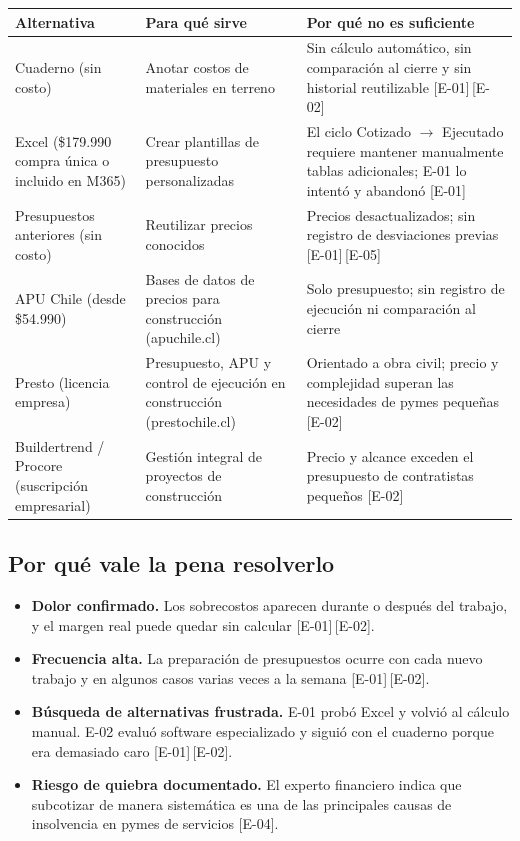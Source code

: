 \documentclass[11pt]{article}
\newcommand{\ev}[1]{\textcolor{prblue}{[#1]}}
\begin{document}
\begin{tabularx}{\linewidth}{@{}lXX@{}}
\toprule
\textbf{Alternativa} & \textbf{Para qué sirve} & \textbf{Por qué no es suficiente} \\
\midrule
Cuaderno (sin costo) & Anotar costos de materiales en terreno & Sin cálculo automático, sin comparación al cierre y sin historial reutilizable \ev{E-01}\,\ev{E-02} \\
Excel (\$179.990 compra única o incluido en M365) & Crear plantillas de presupuesto personalizadas & El ciclo Cotizado $\rightarrow$ Ejecutado requiere mantener manualmente tablas adicionales; E-01 lo intentó y abandonó \ev{E-01} \\
Presupuestos anteriores (sin costo) & Reutilizar precios conocidos & Precios desactualizados; sin registro de desviaciones previas \ev{E-01}\,\ev{E-05} \\
APU Chile (desde \$54.990) & Bases de datos de precios para construcción (apuchile.cl) & Solo presupuesto; sin registro de ejecución ni comparación al cierre \\
Presto (licencia empresa) & Presupuesto, APU y control de ejecución en construcción (prestochile.cl) & Orientado a obra civil; precio y complejidad superan las necesidades de pymes pequeñas \ev{E-02} \\
Buildertrend / Procore (suscripción empresarial) & Gestión integral de proyectos de construcción & Precio y alcance exceden el presupuesto de contratistas pequeños \ev{E-02} \\
\bottomrule
\end{tabularx}

\subsection{Por qué vale la pena resolverlo}

\begin{itemize}
  \item \textbf{Dolor confirmado.} Los sobrecostos aparecen durante o después del
  trabajo, y el margen real puede quedar sin calcular \ev{E-01}\,\ev{E-02}.
  \item \textbf{Frecuencia alta.} La preparación de presupuestos ocurre con cada
  nuevo trabajo y en algunos casos varias veces a la semana \ev{E-01}\,\ev{E-02}.
  \item \textbf{Búsqueda de alternativas frustrada.} E-01 probó Excel y volvió al
  cálculo manual. E-02 evaluó software especializado y siguió con el cuaderno
  porque era demasiado caro \ev{E-01}\,\ev{E-02}.
  \item \textbf{Riesgo de quiebra documentado.} El experto financiero indica que
  subcotizar de manera sistemática es una de las principales causas de insolvencia
  en pymes de servicios \ev{E-04}.
\end{itemize}
\end{document}
